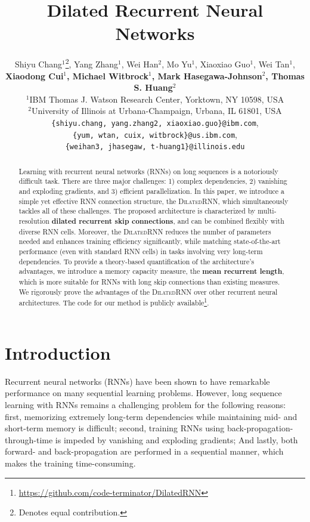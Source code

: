 \documentclass{article}
\title{Dilated Recurrent Neural Networks}
\author{
  Shiyu Chang$^1$\thanks{Denotes equal contribution.}, Yang Zhang$^1$\samethanks, Wei Han$^2$\samethanks, Mo Yu$^1$, Xiaoxiao Guo$^1$, Wei Tan$^1$, \\
  {\bf Xiaodong Cui$^1$, Michael Witbrock$^1$, Mark Hasegawa-Johnson$^2$, Thomas S. Huang$^2$}\\
  $^1$IBM Thomas J. Watson Research Center, Yorktown, NY 10598, USA\\
  $^2$University of Illinois at Urbana-Champaign, Urbana, IL 61801, USA \\
  \texttt{\{shiyu.chang, yang.zhang2, xiaoxiao.guo\}@ibm.com}, \\
  \texttt{\{yum, wtan, cuix, witbrock\}@us.ibm.com},\\ 
  \texttt{\{weihan3, jhasegaw, t-huang1\}@illinois.edu}
}
\newcommand{\algname}{\textsc{DilatedRNN }}
\newcommand{\algnamens}{\textsc{DilatedRNN}}
\begin{document}

\maketitle
\setcounter{footnote}{0}
\begin{abstract}
Learning with recurrent neural networks (RNNs) on long sequences is a notoriously difficult task.  There are three major challenges: 1) complex dependencies, 2) vanishing and exploding gradients, and 3) efficient parallelization. In this paper, we introduce a simple yet effective RNN connection structure, the \algnamens, which simultaneously tackles all of these challenges.  The proposed architecture is characterized by multi-resolution {\bf dilated recurrent skip connections}, and can be combined flexibly with diverse RNN cells.  Moreover, the \algname reduces the number of parameters needed and enhances training efficiency significantly, while matching state-of-the-art performance (even with standard RNN cells) in tasks involving very long-term dependencies.  To provide a theory-based quantification of the architecture's advantages, we introduce a memory capacity measure, the {\bf mean recurrent length}, which is more suitable for RNNs with long skip connections than existing measures.  We rigorously prove the advantages of the \algname over other recurrent neural architectures.  The code for our method is publicly available\footnote{\url{https://github.com/code-terminator/DilatedRNN}}.
\end{abstract}

\section{Introduction}
\label{sect:intro}
Recurrent neural networks (RNNs) have been shown to have remarkable performance on many sequential learning problems.  However, long sequence learning with RNNs remains a challenging problem for the following reasons:  first, memorizing extremely long-term dependencies while maintaining mid- and short-term memory is difficult;  second, training RNNs using back-propagation-through-time is impeded by vanishing and exploding gradients; And lastly, both forward- and back-propagation are performed in a sequential manner, which makes the training time-consuming.  
\end{document}
